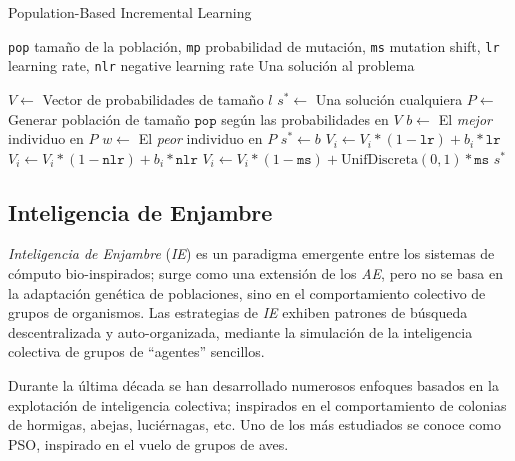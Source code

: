 \begin{algorithm}
\caption{Population-Based Incremental Learning}
\label{pbil-alg}
\begin{algorithmic}[1]

\Require \texttt{pop} tamaño de la población,
	\texttt{mp} probabilidad de mutación,
	\texttt{ms} mutation shift,
	\texttt{lr} learning rate,
	\texttt{nlr} negative learning rate
\Ensure Una solución al problema

\State $V \gets$ Vector de probabilidades de tamaño $l$
\State $s^* \gets$ Una solución cualquiera
	\State $P \gets$ Generar población de tamaño $\texttt{pop}$ según las probabilidades en $V$
	\State $b \gets $ El \emph{mejor} individuo en $P$
	\State $w \gets $ El \emph{peor} individuo en $P$
		\State $s^* \gets b$
	\EndIf
	 
		\State $V_i \gets V_i * (1 - \texttt{lr}) + b_i * \texttt{lr}$
			\State $V_i \gets V_i * (1 - \texttt{nlr}) + b_i * \texttt{nlr}$
		\EndIf
		 
			\State $V_i \gets V_i * (1 - \texttt{ms}) + \mathrm{UnifDiscreta}(0,1) * \texttt{ms}$
		\EndIf
	\EndFor
\EndWhile
\State \Return $s^*$

\end{algorithmic}
\end{algorithm}

\subsection{Inteligencia de Enjambre}

\emph{Inteligencia de Enjambre} \cite{Bonabeau:1999:SIN:328320} (\emph{IE}) es un paradigma emergente entre los sistemas de cómputo bio-inspirados; surge como una extensión de los \emph{AE}, pero no se basa en la adaptación genética de poblaciones, sino en el comportamiento colectivo de grupos de organismos. Las estrategias de \emph{IE} exhiben patrones de búsqueda descentralizada y auto-organizada, mediante la simulación de la inteligencia colectiva de grupos de ``agentes'' sencillos.

Durante la última década se han desarrollado numerosos enfoques basados en la explotación de inteligencia colectiva; inspirados en el comportamiento de colonias de hormigas, abejas, luciérnagas, etc. Uno de los más estudiados se conoce como PSO, inspirado en el vuelo de grupos de aves.

